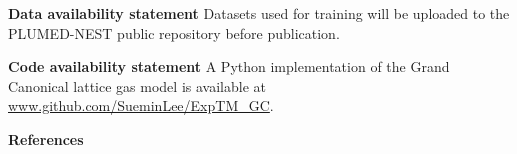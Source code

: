 \documentclass[aip,jcp,reprint,longbibliography]{revtex4-1}
\begin{document}
\textbf{Data availability statement\newline }
Datasets used for training will be uploaded to the PLUMED-NEST public repository before publication. 
\newline


\textbf{Code availability statement\newline }
A Python implementation of the Grand Canonical lattice gas model is available at \href{https://github.com/Suemin-Lee/ExpTM_GC}{www.github.com/Suemin\-Lee/ExpTM\_GC}. 
\newline


\textbf{References}

\end{document}
